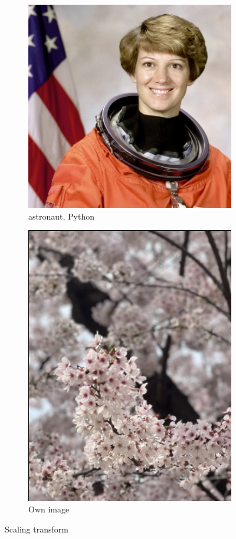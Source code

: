 \documentclass{article}
\begin{document}
\begin{figure}[!ht]
\begin{subfigure}{0.267\textwidth}
        \includegraphics[width=\textwidth]{./fig/scaling_astronaut.png}
        \caption{astronaut, Python}
    \end{subfigure}
    \begin{subfigure}{0.2\textwidth}
        \includegraphics[width=\textwidth]{./fig/scaling_cb.png}
        \caption{Own image}
    \end{subfigure}
    \caption{Scaling transform}
\end{figure}
\end{document}
